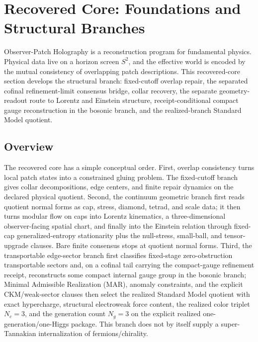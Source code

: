 \section{Recovered Core: Foundations and Structural Branches}\label{observer-patch-holography}

Observer-Patch Holography is a reconstruction program for fundamental physics. Physical data live
on a horizon screen \(S^2\), and the effective world is encoded by the mutual consistency of
overlapping patch descriptions. This recovered-core section develops the structural branch:
fixed-cutoff overlap repair, the separated cofinal refinement-limit consensus bridge, collar
recovery, the separate geometry-readout route to Lorentz and Einstein structure, receipt-conditional compact gauge reconstruction in the bosonic branch, and
the realized-branch Standard Model quotient.

\subsection{Overview}\label{overview}

The recovered core has a simple conceptual order. First, overlap consistency turns local patch
states into a constrained gluing problem. The fixed-cutoff branch gives collar decompositions,
edge centers, and finite repair dynamics on the declared physical quotient. Second, the continuum
geometric branch first reads quotient normal forms as cap, stress, diamond, tetrad, and scale
data; it then turns modular flow on caps into Lorentz kinematics, a three-dimensional
observer-facing spatial chart, and finally into the Einstein
relation through fixed-cap generalized-entropy stationarity plus the null-stress, small-ball,
and tensor-upgrade clauses. Bare finite consensus stops at quotient normal forms. Third, the transportable edge-sector
branch first classifies fixed-stage zero-obstruction transportable sectors and, on a cofinal tail
carrying the compact-gauge refinement receipt, reconstructs some compact
internal gauge group in the bosonic branch; Minimal Admissible Realization (MAR), anomaly constraints, and
the explicit CKM/weak-sector clauses then select the realized Standard Model quotient with
exact hypercharge, structural electroweak force content, the realized color triplet \(N_c=3\), and
the generation count \(N_g=3\) on the explicit realized one-generation/one-Higgs package. This
branch does not by itself supply a super-Tannakian internalization of fermions/chirality.

